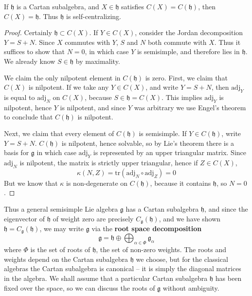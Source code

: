 \begin{theorem}
    If $\mathfrak{h}$ is a Cartan subalgebra, and $X \in \mathfrak{h}$ satisfies $C(X) = C(\mathfrak{h})$, then $C(X) = \mathfrak{h}$. Thus $\mathfrak{h}$ is self-centralizing.
\end{theorem}
\begin{proof}
    Certainly $\mathfrak{h} \subset C(X)$. If $Y \in C(X)$, consider the Jordan decomposition $Y = S + N$. Since $X$ commutes with $Y$, $S$ and $N$ both commute with $X$. Thus it suffices to show that $N = 0$, in which case $Y$ is semisimple, and therefore lies in $\mathfrak{h}$. We already know $S \in \mathfrak{h}$ by maximality.

    We claim the only nilpotent element in $C(\mathfrak{h})$ is zero. First, we claim that $C(X)$ is nilpotent. If we take any $Y \in C(X)$, and write $Y = S + N$, then $\text{adj}_Y$ is equal to $\text{adj}_N$ on $C(X)$, because $S \in \mathfrak{h} = C(X)$. This implies $\text{adj}_Y$ is nilpotent, hence $Y$ is nilpotent, and since $Y$ was arbitrary we use Engel's theorem to conclude that $C(\mathfrak{h})$ is nilpotent.

    Next, we claim that every element of $C(\mathfrak{h})$ is semisimple. If $Y \in C(\mathfrak{h})$, write $Y = S + N$. $C(\mathfrak{h})$ is nilpotent, hence solvable, so by Lie's theorem there is a basis for $\mathfrak{g}$ in which case $\text{adj}_Y$ is represented by an upper triangular matrix. Since $\text{adj}_N$ is nilpotent, the matrix is strictly upper triangular, hence if $Z \in C(X)$,
    \[ \kappa(N,Z) = \text{tr}(\text{adj}_N \circ \text{adj}_Z) = 0 \]
    But we know that $\kappa$ is non-degenerate on $C(\mathfrak{h})$, because it contains $\mathfrak{h}$, so $N = 0$.
\end{proof}

Thus a general semisimple Lie algebra $\mathfrak{g}$ has a Cartan subalgebra $\mathfrak{h}$, and since the eigenvector of $\mathfrak{h}$ of weight zero are precisely $C_\mathfrak{g}(\mathfrak{h})$, and we have shown $\mathfrak{h} = C_\mathfrak{g}(\mathfrak{h})$, we may write $\mathfrak{g}$ via the {\bf root space decomposition}
%
\[ \mathfrak{g} = \mathfrak{h} \oplus \bigoplus_{\alpha \in \Phi} \mathfrak{g}_\alpha \]
%
where $\Phi$ is the set of roots of $\mathfrak{h}$, the set of non-zero weights. The roots and weights depend on the Cartan subalgebra $\mathfrak{h}$ we choose, but for the classical algebras the Cartan subalgebra is canonical -- it is simply the diagonal matrices in the algebra. We shall assume that a particular Cartan subalgebra $\mathfrak{h}$ has been fixed over the space, so we can discuss the roots of $\mathfrak{g}$ without ambiguity.

